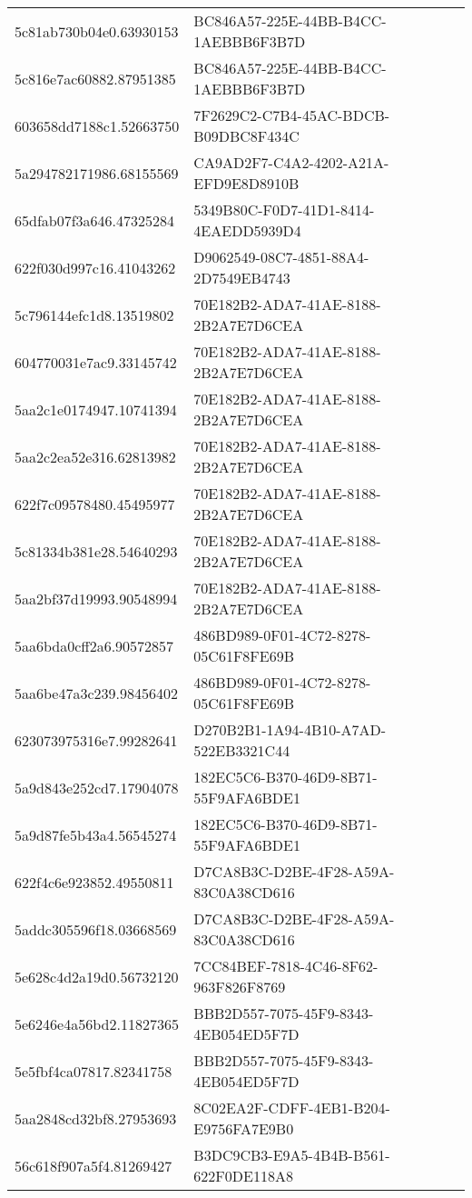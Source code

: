 \begin{tabular}{ll}
5c81ab730b04e0.63930153 & BC846A57-225E-44BB-B4CC-1AEBBB6F3B7D \\
5c816e7ac60882.87951385 & BC846A57-225E-44BB-B4CC-1AEBBB6F3B7D \\
603658dd7188c1.52663750 & 7F2629C2-C7B4-45AC-BDCB-B09DBC8F434C \\
5a294782171986.68155569 & CA9AD2F7-C4A2-4202-A21A-EFD9E8D8910B \\
65dfab07f3a646.47325284 & 5349B80C-F0D7-41D1-8414-4EAEDD5939D4 \\
622f030d997c16.41043262 & D9062549-08C7-4851-88A4-2D7549EB4743 \\
5c796144efc1d8.13519802 & 70E182B2-ADA7-41AE-8188-2B2A7E7D6CEA \\
604770031e7ac9.33145742 & 70E182B2-ADA7-41AE-8188-2B2A7E7D6CEA \\
5aa2c1e0174947.10741394 & 70E182B2-ADA7-41AE-8188-2B2A7E7D6CEA \\
5aa2c2ea52e316.62813982 & 70E182B2-ADA7-41AE-8188-2B2A7E7D6CEA \\
622f7c09578480.45495977 & 70E182B2-ADA7-41AE-8188-2B2A7E7D6CEA \\
5c81334b381e28.54640293 & 70E182B2-ADA7-41AE-8188-2B2A7E7D6CEA \\
5aa2bf37d19993.90548994 & 70E182B2-ADA7-41AE-8188-2B2A7E7D6CEA \\
5aa6bda0cff2a6.90572857 & 486BD989-0F01-4C72-8278-05C61F8FE69B \\
5aa6be47a3c239.98456402 & 486BD989-0F01-4C72-8278-05C61F8FE69B \\
623073975316e7.99282641 & D270B2B1-1A94-4B10-A7AD-522EB3321C44 \\
5a9d843e252cd7.17904078 & 182EC5C6-B370-46D9-8B71-55F9AFA6BDE1 \\
5a9d87fe5b43a4.56545274 & 182EC5C6-B370-46D9-8B71-55F9AFA6BDE1 \\
622f4c6e923852.49550811 & D7CA8B3C-D2BE-4F28-A59A-83C0A38CD616 \\
5addc305596f18.03668569 & D7CA8B3C-D2BE-4F28-A59A-83C0A38CD616 \\
5e628c4d2a19d0.56732120 & 7CC84BEF-7818-4C46-8F62-963F826F8769 \\
5e6246e4a56bd2.11827365 & BBB2D557-7075-45F9-8343-4EB054ED5F7D \\
5e5fbf4ca07817.82341758 & BBB2D557-7075-45F9-8343-4EB054ED5F7D \\
5aa2848cd32bf8.27953693 & 8C02EA2F-CDFF-4EB1-B204-E9756FA7E9B0 \\
56c618f907a5f4.81269427 & B3DC9CB3-E9A5-4B4B-B561-622F0DE118A8 \\

\end{tabular}
